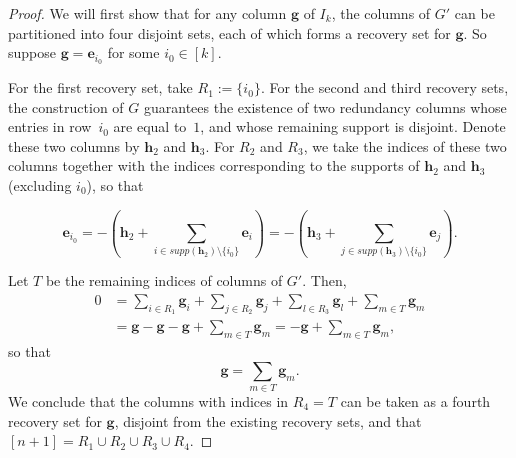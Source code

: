\documentclass[11pt,a4paper]{article}
\theoremstyle{definition}
\newcommand{\bfe}{{\boldsymbol e}}
\newcommand{\bfg}{{\boldsymbol g}}
\newcommand{\bfh}{{\boldsymbol h}}
\begin{document}
\begin{proof} 
    We will first show that for any column $\bfg$ of $I_k$, the columns of $G'$ can be partitioned into four disjoint sets, each of which forms a recovery set for $\bfg$. So suppose $\bfg=\bfe_{i_0}$ for some $i_0\in[k]$. 
    
    For the first recovery set, take $R_1 := \{i_0\}$. For the second and third recovery sets, the construction of $G$ guarantees the existence of two redundancy columns whose entries in row~$i_0$ are equal to~$1$, and whose remaining support is disjoint. Denote these two columns by $\bfh_2$ and $\bfh_3$. For $R_2$ and $R_3$, we take the indices of these two columns together with the indices corresponding to the supports of $\bfh_{2}$ and $\bfh_{3}$ (excluding $i_0$), so that
    
    $$
         \bfe_{i_0} = - \left( \bfh_{2} + \sum_{i \in supp(\bfh_{2}) \setminus\{i_0\}} \bfe_i \right) = - \left( \bfh_{3} + \sum_{j \in supp(\bfh_{3})\setminus\{i_0\}} \bfe_j \right).
    $$
    
    Let $T$ be the remaining indices of columns of $G'$. Then, 
    \begin{align*}
        0 & =   \sum_{i\in R_1} \bfg_i + \sum_{j\in R_2}\bfg_j + \sum_{l\in R_3} \bfg_l + \sum_{m\in T}\bfg_m \\
        &= \bfg - \bfg - \bfg  + \sum_{m\in T}\bfg_m = - \bfg + \sum_{m\in T}\bfg_m,
    \end{align*}
    so that 
    $$
        \bfg  =  \sum_{m\in T}\bfg_m.
    $$
    We conclude that the columns with indices in $R_4 =  T$ can be taken as a fourth recovery set for $\bfg$, disjoint from the existing recovery sets, and that $[n+1] = R_1 \cup R_2 \cup R_3 \cup R_4$. 


\end{proof}
\end{document}
